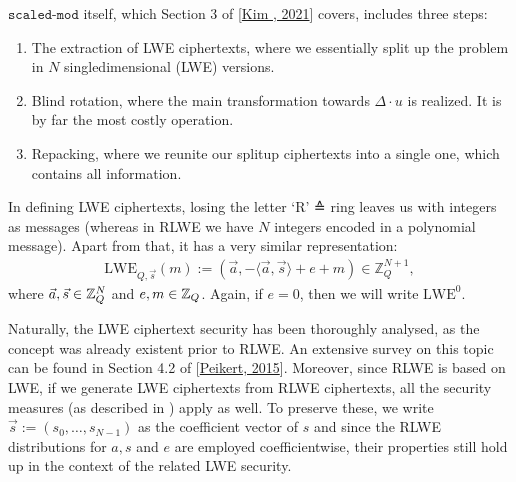 \documentclass[letterpaper,10pt,english]{jupyterBook}
\begin{document}
\sphinxAtStartPar
\(\texttt{scaled-mod}\) itself, which Section 3 of {[}\hyperlink{cite.Thesis:id72}{Kim , 2021}{]} covers, includes three steps:
\begin{enumerate}
%
\item {} 
\sphinxAtStartPar
The extraction of LWE ciphertexts, where we essentially split up the problem in \(N\) single\sphinxhyphen{}dimensional (LWE) versions.

\item {} 
\sphinxAtStartPar
Blind rotation, where the main transformation towards \(\Delta \cdot u\) is realized.
It is by far the most costly operation.

\item {} 
\sphinxAtStartPar
Repacking, where we reunite our split\sphinxhyphen{}up ciphertexts into a single one, which contains all information.

\end{enumerate}
\label{\detokenize{Thesis:extraction-of-lwe-ciphertexts}}
\begin{DUlineblock}{0em}
\item[] 
\end{DUlineblock}

\sphinxAtStartPar
In defining LWE ciphertexts, losing the letter ‘R’ ≙ ring leaves us with integers as messages (whereas in RLWE we have \(N\) integers encoded in a polynomial message).
Apart from that, it has a very similar representation:
\begin{equation*}
\begin{split}\mathrm{LWE}_{Q,\vec s}(m) := (\vec a, -\langle \vec a, \vec s\rangle + e + m) \in \mathbb Z_Q^{N+1},\end{split}
\end{equation*}
\sphinxAtStartPar
where \(\vec a, \vec s \in \mathbb Z_Q^N\) and \(e, m \in \mathbb Z_Q\).
Again, if \(e = 0\), then we will write \(\mathrm{LWE}^0\).

\sphinxAtStartPar
Naturally, the LWE ciphertext security has been thoroughly analysed, as the concept was already existent prior to RLWE.
An extensive survey on this topic can be found in Section 4.2 of {[}\hyperlink{cite.Thesis:id65}{Peikert, 2015}{]}.
Moreover, since RLWE is based on LWE, if we generate LWE ciphertexts from RLWE ciphertexts, all the security measures (as described in {\hyperref[\detokenize{Thesis:security}]{}}) apply as well.
To preserve these, we write \(\vec s := (s_0,\dots,s_{N-1})\) as the coefficient vector of \(s\) and since the RLWE distributions for \(a,s\) and \(e\) are employed coefficient\sphinxhyphen{}wise, their properties still hold up in the context of the related LWE security.
\end{document}
